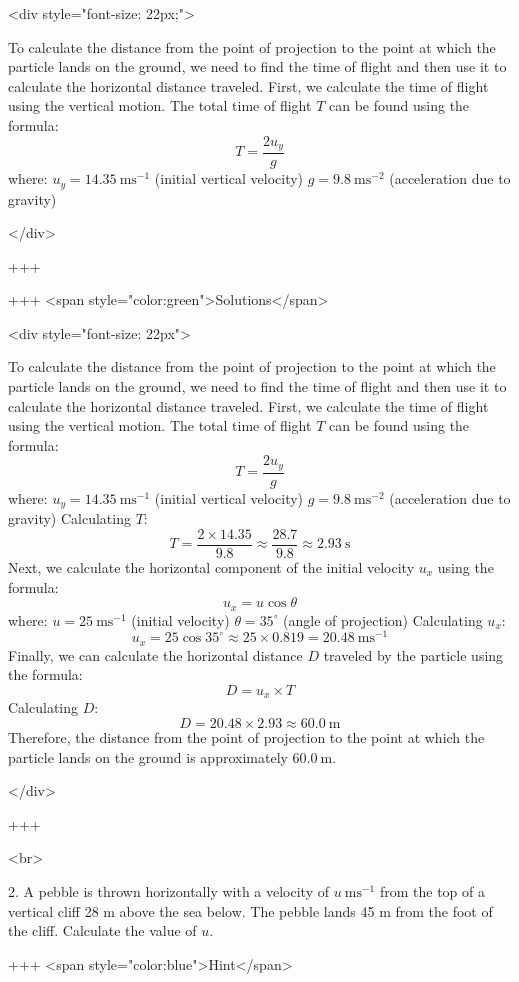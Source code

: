 <div style="font-size: 22px;">

To calculate the distance from the point of projection to the point at which the particle lands on the ground, we need to find the time of flight and then use it to calculate the horizontal distance traveled.
First, we calculate the time of flight using the vertical motion. The total time of flight $T$ can be found using the formula:
$$ T = \frac{2 u_y}{g} $$
where:
$u_y = 14.35 \mathrm{~ms}^{-1}$ (initial vertical velocity)
$g = 9.8 \mathrm{~ms}^{-2}$ (acceleration due to gravity)

</div>

+++

+++ <span style="color:green">Solutions</span>

<div style="font-size: 22px">

To calculate the distance from the point of projection to the point at which the particle lands on the ground, we need to find the time of flight and then use it to calculate the horizontal distance traveled.
First, we calculate the time of flight using the vertical motion. The total time of flight $T$ can be found using the formula:
$$ T = \frac{2 u_y}{g} $$
where:
$u_y = 14.35 \mathrm{~ms}^{-1}$ (initial vertical velocity)
$g = 9.8 \mathrm{~ms}^{-2}$ (acceleration due to gravity)
Calculating $T$:
$$ T = \frac{2 \times 14.35}{9.8} \approx \frac{28.7}{9.8} \approx 2.93 \mathrm{~s} $$
Next, we calculate the horizontal component of the initial velocity $u_x$ using the formula:
$$ u_x = u \cos \theta $$
where:
$u = 25 \mathrm{~ms}^{-1}$ (initial velocity)
$\theta = 35^{\circ}$ (angle of projection)
Calculating $u_x$:
$$ u_x = 25 \cos 35^{\circ} \approx 25 \times 0.819 = 20.48 \mathrm{~ms}^{-1} $$
Finally, we can calculate the horizontal distance $D$ traveled by the particle using the formula:
$$ D = u_x \times T $$
Calculating $D$:
$$ D = 20.48 \times 2.93 \approx 60.0 \mathrm{~m} $$
Therefore, the distance from the point of projection to the point at which the particle lands on the ground is approximately $60.0 \mathrm{~m}$.

</div>

+++

<br>

2. A pebble is thrown horizontally with a velocity of $u \mathrm{~ms}^{-1}$ from the top of a vertical cliff 28 m above the sea below. The pebble lands 45 m from the foot of the cliff. Calculate the value of $u$.

+++ <span style="color:blue">Hint</span>

